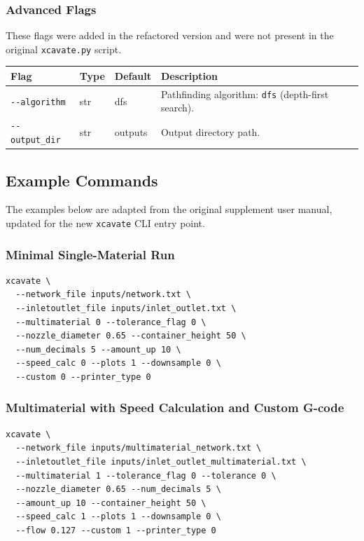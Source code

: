 \documentclass[11pt,letterpaper]{article}
\newcommand{\code}[1]{\texttt{#1}}
\begin{document}
\subsubsection{Advanced Flags}

\begin{claudebox}
These flags were added in the refactored version and were not present in the
original \code{xcavate.py} script.
\end{claudebox}

\begin{tabularx}{\textwidth}{L{3.8cm} l l X}
\toprule
\textbf{Flag} & \textbf{Type} & \textbf{Default} & \textbf{Description} \\
\midrule
\code{-{}-algorithm} & str & dfs & Pathfinding algorithm: \code{dfs} (depth-first search). \\
\code{-{}-output\_dir} & str & outputs & Output directory path. \\
\bottomrule
\end{tabularx}

\subsection{Example Commands}

\begin{claudebox}
The examples below are adapted from the original supplement user manual,
updated for the new \code{xcavate} CLI entry point.
\end{claudebox}

\subsubsection{Minimal Single-Material Run}

\begin{lstlisting}
xcavate \
  --network_file inputs/network.txt \
  --inletoutlet_file inputs/inlet_outlet.txt \
  --multimaterial 0 --tolerance_flag 0 \
  --nozzle_diameter 0.65 --container_height 50 \
  --num_decimals 5 --amount_up 10 \
  --speed_calc 0 --plots 1 --downsample 0 \
  --custom 0 --printer_type 0
\end{lstlisting}

\subsubsection{Multimaterial with Speed Calculation and Custom G-code}

\begin{lstlisting}
xcavate \
  --network_file inputs/multimaterial_network.txt \
  --inletoutlet_file inputs/inlet_outlet_multimaterial.txt \
  --multimaterial 1 --tolerance_flag 0 --tolerance 0 \
  --nozzle_diameter 0.65 --num_decimals 5 \
  --amount_up 10 --container_height 50 \
  --speed_calc 1 --plots 1 --downsample 0 \
  --flow 0.127 --custom 1 --printer_type 0
\end{lstlisting}
\end{document}
